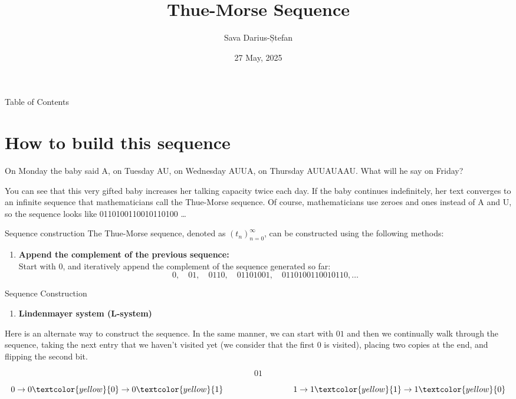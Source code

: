 \documentclass{beamer}
\title{Thue-Morse Sequence}
\author {Sava Darius-Ștefan}
\institute{Faculty of Computer Science\\University of Bucharest}
\date{27 May, 2025}
\begin{document}
\begin{frame}
    \titlepage
\end{frame}

\begin{frame}{Table of Contents}
    \tableofcontents
\end{frame}

\section{How to build this sequence}

\begin{frame}
    On Monday the baby said A, on Tuesday AU, on Wednesday AUUA, on Thursday AUUAUAAU. What will he say on Friday?

    \vspace{2cm}

    You can see that this very gifted baby increases her talking capacity twice each day. If the baby continues indefinitely, her text converges to an infinite sequence that mathematicians call the Thue-Morse sequence. Of course, mathematicians use zeroes and ones instead of A and U, so the sequence looks like 0110100110010110100 \dots
\end{frame}

\begin{frame}{Sequence construction}
    The Thue-Morse sequence, denoted as \( (t_n)_{n=0}^\infty \), can be constructed using the following methods:
    \vspace{1cm}
    \begin{enumerate}
        \item \textbf{Append the complement of the previous sequence:}\\
        Start with \( 0 \), and iteratively append the complement of the sequence generated so far:
        \[
        0, \quad 01, \quad 0110, \quad 01101001, \quad 0110100110010110, \dots
        \]
    \end{enumerate}
\end{frame}

\begin{frame}{Sequence Construction}
    \begin{enumerate}[2]
    \item \textbf{\large Lindenmayer system (L-system)}
    \end{enumerate}
    \vspace{0.5cm}
    Here is an alternate way to construct the sequence. In the same manner, we can start with $01$ and then we continually walk through the sequence, taking the next entry that we haven't visited yet (we consider that the first $0$ is visited), placing two copies at the end, and flipping the second bit. 

    \[
    01
    \]

    \[
        0 \rightarrow 0\textcolor{yellow}{0} \rightarrow 0\textcolor{yellow}{1} \hspace{3cm} 1 \rightarrow 1\textcolor{yellow}{1} \rightarrow 1\textcolor{yellow}{0}
    \]

\end{frame}
\end{document}
